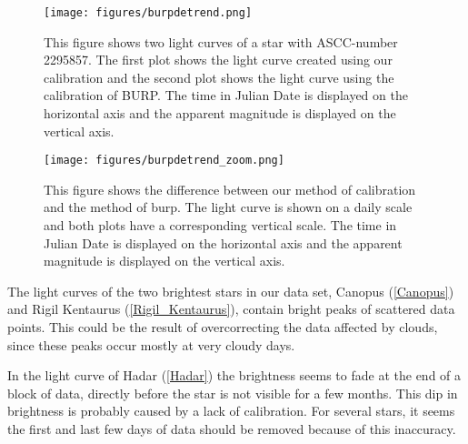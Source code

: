 \documentclass[onecolumn]{aa} %
\begin{document}
\begin{figure}
    \centering
    \texttt{[image: figures/burpdetrend.png]}
    \caption{This figure shows two light curves of a star with ASCC-number 2295857. The first plot shows the light curve created using our calibration and the second plot shows the light curve using the calibration of BURP. The time in Julian Date is displayed on the horizontal axis and the apparent magnitude is displayed on the vertical axis.}
    
    \label{burp}
\end{figure}
\begin{figure}
    \centering
    \texttt{[image: figures/burpdetrend\_zoom.png]}
    \caption{This figure shows the difference between our method of calibration and the method of burp. The light curve is shown on a daily scale and both plots have a corresponding vertical scale. The time in Julian Date is displayed on the horizontal axis and the apparent magnitude is displayed on the vertical axis.}
    \label{burpzoom}
\end{figure}

The light curves of the two brightest stars in our data set, Canopus (\ref{Canopus}) and Rigil Kentaurus (\ref{Rigil_Kentaurus}), contain bright peaks of scattered data points. This could be the result of overcorrecting the data affected by clouds, since these peaks occur mostly at very cloudy days.

In the light curve of Hadar (\ref{Hadar}) the brightness seems to fade at the end of a block of data, directly before the star is not visible for a few months. This dip in brightness is probably caused by a lack of calibration. For several stars, it seems the first and last few days of data should be removed because of this inaccuracy.
\end{document}
